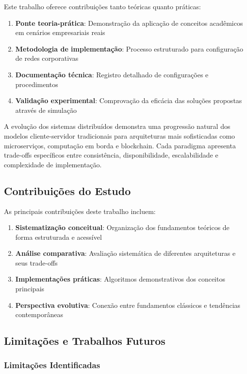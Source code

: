 Este trabalho oferece contribuições tanto teóricas quanto práticas:

\begin{enumerate}
    \item \textbf{Ponte teoria-prática}: Demonstração da aplicação de conceitos acadêmicos em cenários empresariais reais
    \item \textbf{Metodologia de implementação}: Processo estruturado para configuração de redes corporativas
    \item \textbf{Documentação técnica}: Registro detalhado de configurações e procedimentos
    \item \textbf{Validação experimental}: Comprovação da eficácia das soluções propostas através de simulação
\end{enumerate}

A evolução dos sistemas distribuídos demonstra uma progressão natural dos modelos cliente-servidor tradicionais para arquiteturas mais sofisticadas como microserviços, computação em borda e blockchain. Cada paradigma apresenta trade-offs específicos entre consistência, disponibilidade, escalabilidade e complexidade de implementação.

\subsection{Contribuições do Estudo}

As principais contribuições deste trabalho incluem:

\begin{enumerate}
    \item \textbf{Sistematização conceitual}: Organização dos fundamentos teóricos de forma estruturada e acessível
    \item \textbf{Análise comparativa}: Avaliação sistemática de diferentes arquiteturas e seus trade-offs
    \item \textbf{Implementações práticas}: Algoritmos demonstrativos dos conceitos principais
    \item \textbf{Perspectiva evolutiva}: Conexão entre fundamentos clássicos e tendências contemporâneas
\end{enumerate}

\subsection{Limitações e Trabalhos Futuros}

\subsubsection{Limitações Identificadas}

